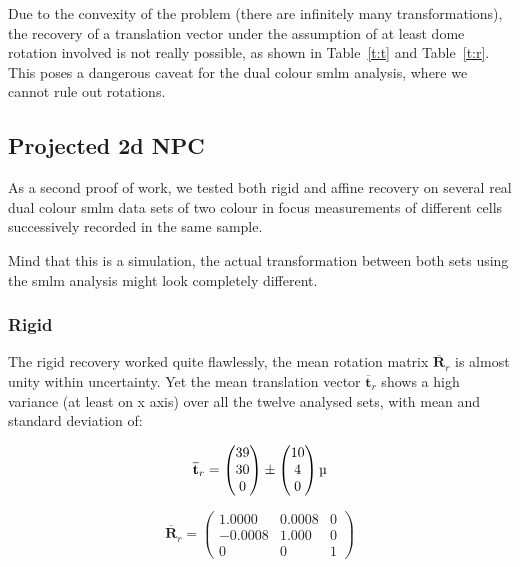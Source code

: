 \documentclass[11pt, a4paper, oneside, twocolumn]{report}
\renewcommand{\b}{\textbf}
\newcommand{\m}{\mathrm}
\begin{document}
Due to the convexity of the problem (there are infinitely many
transformations), the recovery of a translation vector under the
assumption of at least dome rotation involved is not really possible,
as shown in Table~\ref{t:t} and Table~\ref{t:r}. This poses a
dangerous caveat for the dual colour \gls{smlm} analysis, where we
cannot rule out rotations.


\subsection{Projected 2d NPC}

As a second proof of work, we tested both rigid and affine recovery on
several real dual colour \gls{smlm} data sets of two colour in focus
measurements of different cells successively recorded in the same
sample.

Mind that this is a simulation, the actual transformation between both
sets using the \gls{smlm} analysis might look completely different.


\subsubsection{Rigid}

The rigid recovery worked quite flawlessly, the mean rotation matrix
$\overline{\b{R}}_r$ is almost unity within uncertainty. Yet the mean
translation vector $\overline{\b{t}}_r$ shows a high variance (at
least on x axis) over all the twelve analysed sets, with mean and
standard deviation of:

\begin{equation}
  \overline{\b{t}}_r=
  \begin{pmatrix}
    39 \\
    30 \\
    0 \\
  \end{pmatrix}
  \pm
  \begin{pmatrix}
    10 \\
    4 \\
    0 \\
  \end{pmatrix}
  \si{\micro\m}
\end{equation}

\begin{equation}
  \overline{\b{R}}_r =
  \begin{pmatrix}
    1.0000 & 0.0008 & 0 \\
    -0.0008 & 1.000 & 0 \\
    0 & 0 & 1
  \end{pmatrix}
\end{equation}
\end{document}
